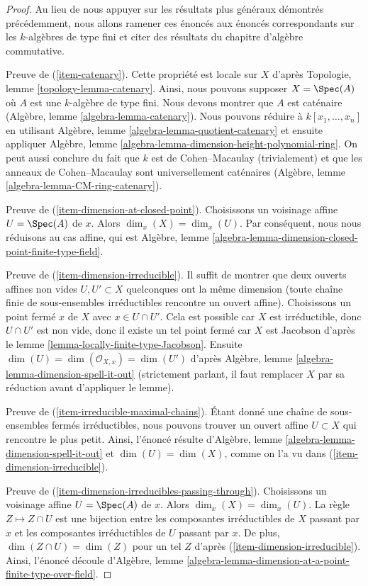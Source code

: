 \begin{proof}
Au lieu de nous appuyer sur les résultats plus généraux
démontrés précédemment, nous allons ramener ces énoncés aux
énoncés correspondants sur les $k$-algèbres de type fini et
citer des résultats du chapitre d'algèbre commutative.

\medskip\noindent
Preuve de (\ref{item-catenary}). Cette propriété est locale sur $X$ d'après
Topologie, lemme \ref{topology-lemma-catenary}. Ainsi, nous
pouvons supposer $X = \Spec(A)$ où $A$ est une $k$-algèbre de
type fini. Nous devons montrer que $A$ est caténaire (Algèbre,
lemme \ref{algebra-lemma-catenary}). Nous pouvons réduire à
$k[x_1, \ldots, x_n]$ en utilisant Algèbre, lemme
\ref{algebra-lemma-quotient-catenary} et ensuite appliquer
Algèbre, lemme
\ref{algebra-lemma-dimension-height-polynomial-ring}. On peut aussi conclure
du fait que $k$ est de Cohen--Macaulay (trivialement) et que les anneaux de Cohen--Macaulay
sont universellement caténaires (Algèbre, lemme \ref{algebra-lemma-CM-ring-catenary}).

\medskip\noindent
Preuve de (\ref{item-dimension-at-closed-point}). Choisissons un
voisinage affine $U = \Spec(A)$ de $x$. Alors $\dim_x(X) =
\dim_x(U)$. Par conséquent, nous nous réduisons au cas affine, qui est
Algèbre, lemme \ref{algebra-lemma-dimension-closed-point-finite-type-field}.

\medskip\noindent
Preuve de (\ref{item-dimension-irreducible}). Il suffit de
montrer que deux ouverts affines non vides $U, U' \subset X$
quelconques ont la même dimension (toute chaîne finie de
sous-ensembles irréductibles rencontre un ouvert affine).
Choisissons un point fermé $x$ de $X$ avec $x \in U \cap U'$. Cela
est possible car $X$ est irréductible, donc $U \cap U'$ est non
vide, donc il existe un tel point fermé car $X$ est Jacobson
d'après le lemme \ref{lemma-locally-finite-type-Jacobson}. Ensuite
$\dim(U) = \dim(\mathcal{O}_{X, x}) = \dim(U')$ d'après Algèbre,
lemme \ref{algebra-lemma-dimension-spell-it-out} (strictement
parlant, il faut remplacer $X$ par sa réduction avant d'appliquer le lemme).

\medskip\noindent
Preuve de (\ref{item-irreducible-maximal-chains}). Étant
donné une chaîne de sous-ensembles fermés irréductibles, nous
pouvons trouver un ouvert affine $U \subset X$ qui rencontre
le plus petit. Ainsi, l'énoncé résulte d'Algèbre, lemme
\ref{algebra-lemma-dimension-spell-it-out} et $\dim(U) =
\dim(X)$, comme on l'a vu dans (\ref{item-dimension-irreducible}).

\medskip\noindent
Preuve de
(\ref{item-dimension-irreducibles-passing-through}).
Choisissons un voisinage affine $U = \Spec(A)$ de $x$. Alors
$\dim_x(X) = \dim_x(U)$. La règle $Z \mapsto Z \cap U$ est une
bijection entre les composantes irréductibles de $X$ passant par
$x$ et les composantes irréductibles de $U$ passant par $x$. De
plus, $\dim(Z \cap U) = \dim(Z)$ pour un tel $Z$ d'après
(\ref{item-dimension-irreducible}). Ainsi, l'énoncé découle d'Algèbre,
lemme \ref{algebra-lemma-dimension-at-a-point-finite-type-over-field}.


\end{proof}
